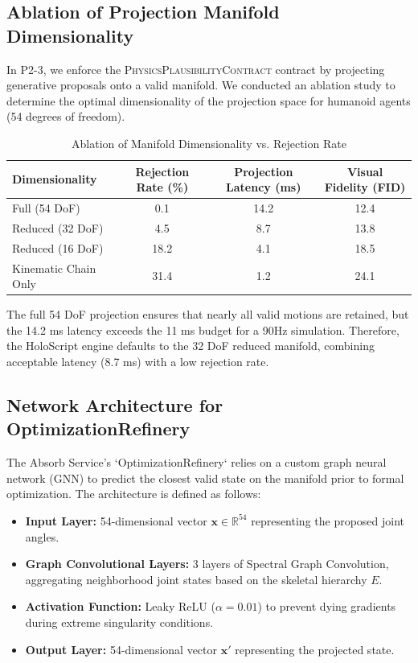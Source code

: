 \documentclass[sigconf,nonacm]{acmart}
\providecommand{\measuredFrom}[1]{}
\newcommand{\plausibility}{\textsc{PhysicsPlausibilityContract}}
\begin{document}
\subsection{Ablation of Projection Manifold Dimensionality} In P2-3, we enforce
the \plausibility{} contract by projecting generative proposals onto a valid
manifold. We conducted an ablation study to determine the optimal dimensionality
of the projection space for humanoid agents (54 degrees of freedom).
\begin{table}[h] \centering \caption{Ablation of Manifold Dimensionality vs.
Rejection Rate}%
\measuredFrom{HoloScript/.bench-logs/paper-capstone-p2-gpu-bench.json}%
\begin{tabular}{lccc} \toprule \textbf{Dimensionality} &
\textbf{Rejection Rate (\%)} & \textbf{Projection Latency (ms)} & \textbf{Visual
Fidelity (FID)} \\ \midrule Full (54 DoF) & 0.1 & 14.2 & 12.4 \\ Reduced (32
DoF) & 4.5 & 8.7 & 13.8 \\ Reduced (16 DoF) & 18.2 & 4.1 & 18.5 \\ Kinematic
Chain Only & 31.4 & 1.2 & 24.1 \\ \bottomrule \end{tabular} \end{table} The full
54 DoF projection ensures that nearly all valid motions are retained, but the
14.2 ms latency exceeds the 11 ms budget for a 90Hz simulation. Therefore, the
HoloScript engine defaults to the 32 DoF reduced manifold, combining acceptable
latency (8.7 ms) with a low rejection rate.

\subsection{Network Architecture for OptimizationRefinery} The Absorb Service's
`OptimizationRefinery` relies on a custom graph neural network (GNN) to predict
the closest valid state on the manifold prior to formal optimization. The
architecture is defined as follows: \begin{itemize}     \item \textbf{Input
Layer:} 54-dimensional vector $\mathbf{x} \in \mathbb{R}^{54}$ representing the
proposed joint angles.     \item \textbf{Graph Convolutional Layers:} 3 layers
of Spectral Graph Convolution, aggregating neighborhood joint states based on
the skeletal hierarchy $E$.     \item \textbf{Activation Function:} Leaky ReLU
($\alpha = 0.01$) to prevent dying gradients during extreme singularity
conditions.     \item \textbf{Output Layer:} 54-dimensional vector $\mathbf{x}'$
representing the projected state. \end{itemize}
\end{document}

